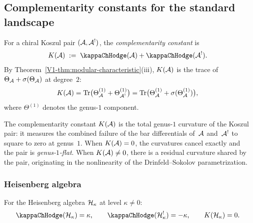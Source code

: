 %
%

\subsection{Complementarity constants for the standard landscape}
\label{subsec:thqg-IV-complementarity-constant}

\begin{definition}
\label{def:thqg-IV-complementarity-constant}
For a chiral Koszul pair $(\mathcal{A}, \mathcal{A}^!)$, the
\emph{complementarity constant} is
\begin{equation}%
K(\cA)
\;:=\;
\kappaChHodge(\cA) + \kappaChHodge(\cA^!).
\end{equation}
By Theorem~\ref{V1-thm:modular-characteristic}\textup{(}iii\textup{)},
$K(\mathcal{A})$ is the trace of
$\Theta_{\mathcal{A}} + \sigma(\Theta_{\mathcal{A}})$ at degree~$2$:
\[
K(\mathcal{A})
= \operatorname{Tr}\bigl(\Theta_{\mathcal{A}}^{(1)} + \Theta_{\mathcal{A}^!}^{(1)}\bigr)
= \operatorname{Tr}\bigl(\Theta_{\mathcal{A}}^{(1)} + \sigma(\Theta_{\mathcal{A}}^{(1)})\bigr),
\]
where $\Theta^{(1)}$ denotes the genus-$1$ component.
\end{definition}

\begin{remark}
The complementarity constant $K(\mathcal{A})$ is the total genus-$1$
curvature of the Koszul pair: it measures the combined failure of the
bar differentials of~$\mathcal{A}$ and~$\mathcal{A}^!$ to square to zero at
genus~$1$. When $K(\mathcal{A}) = 0$, the curvatures cancel exactly and the
pair is \emph{genus-$1$-flat}. When $K(\mathcal{A}) \neq 0$, there is a
residual curvature shared by the pair, originating in the nonlinearity
of the Drinfeld--Sokolov parametrization.
\end{remark}

\subsubsection{Heisenberg algebra}

\begin{proposition}
For the Heisenberg algebra $\mathcal{H}_\kappa$ at level $\kappa \neq 0$:
\begin{equation}%
\kappaChHodge(\cH_\kappa) = \kappa,
\qquad
\kappaChHodge(\cH_\kappa^!) = -\kappa,
\qquad
K(\cH_\kappa) = 0.
\end{equation}
\end{proposition}

